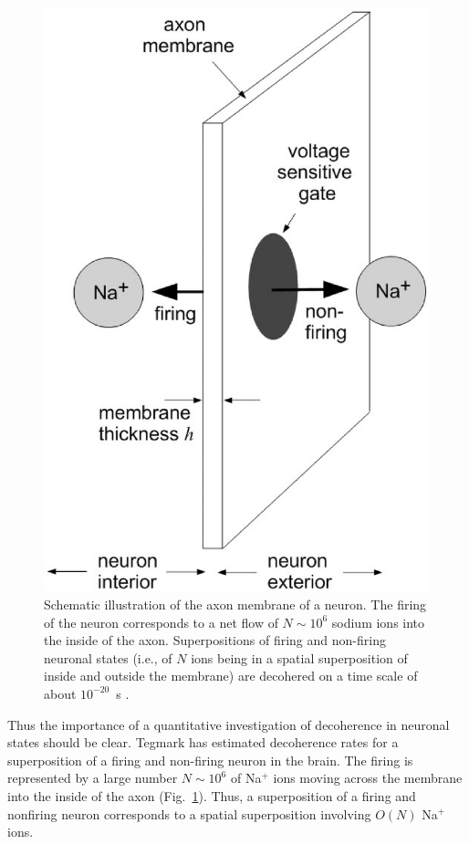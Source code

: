 \documentclass[12pt,aps,floatfix,amsmath,amssymb,showpacs,nofootinbib]{revtex4-2}
\begin{document}
\begin{figure}
\begin{center}
\includegraphics[scale=.3]{neuron-n.eps}
\end{center}
\caption[Schematic illustration of the axon
membrane of a neuron]{\label{fig:neuron} Schematic illustration of the
  axon membrane of a neuron. The firing of the neuron corresponds to a
  net flow of $N \sim 10^6$ sodium ions into the inside of the axon.
  Superpositions of firing and non-firing neuronal states (i.e., of
  $N$ ions being in a spatial superposition of inside and outside the
  membrane) are decohered on a time scale of about $10^{-20}$~s
  \cite{Tegmark:2000:wz}. }
\end{figure}

Thus the importance of a quantitative investigation of decoherence in
neuronal states should be clear. Tegmark \cite{Tegmark:2000:wz} has
estimated decoherence rates for a superposition of a firing and
non-firing neuron in the brain. The firing is represented by a large
number $N \sim 10^6$ \cite{Tegmark:2000:wz} of Na$^+$ ions moving
across the membrane into the inside of the axon
(Fig.~\ref{fig:neuron}). Thus, a superposition of a firing and
nonfiring neuron corresponds to a spatial superposition involving
$O(N)$ Na$^+$ ions.
\end{document}
